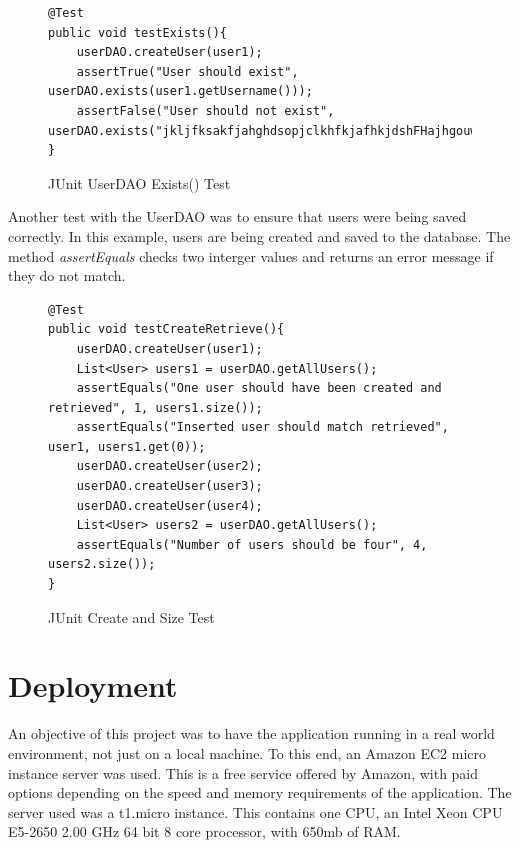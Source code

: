\begin{figure}[H]
\begin{lstlisting}
@Test
public void testExists(){
	userDAO.createUser(user1);
	assertTrue("User should exist", userDAO.exists(user1.getUsername()));
	assertFalse("User should not exist", userDAO.exists("jkljfksakfjahghdsopjclkhfkjafhkjdshFHajhgouwe"));
}
\end{lstlisting}
\caption{JUnit UserDAO Exists() Test}
\end{figure}

Another test with the UserDAO was to ensure that users were being saved correctly. In this example, users are being created and saved to the database. The method \textit{assertEquals} checks two interger values and returns an error message if they do not match.

\begin{figure}[H]
\begin{lstlisting}
@Test 
public void testCreateRetrieve(){
	userDAO.createUser(user1);
	List<User> users1 = userDAO.getAllUsers();
	assertEquals("One user should have been created and retrieved", 1, users1.size());
	assertEquals("Inserted user should match retrieved", user1, users1.get(0));
	userDAO.createUser(user2);
	userDAO.createUser(user3);
	userDAO.createUser(user4);
	List<User> users2 = userDAO.getAllUsers();
	assertEquals("Number of users should be four", 4, users2.size());
}
\end{lstlisting}
\caption{JUnit Create and Size Test}
\end{figure}

\section{Deployment}

An objective of this project was to have the application running in a real world environment, not just on a local machine. To this end, an Amazon EC2 micro instance server was used. This is a free service offered by Amazon, with paid options depending on the speed and memory requirements of the application. The server used was a 	t1.micro instance. This contains one CPU, an Intel Xeon CPU E5-2650 2.00 GHz 64 bit 8 core processor, with 650mb of RAM. 

